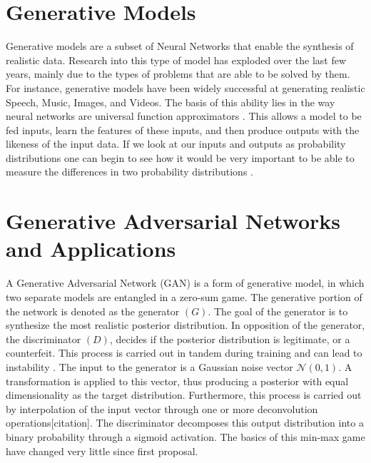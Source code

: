 \section{Generative Models}
Generative models are a subset of Neural Networks that enable the synthesis of realistic data. Research into this type of model has exploded over the last few years, mainly due to the types of problems that are able to be solved by them. For instance, generative models have been widely successful at generating realistic Speech, Music, Images, and Videos. The basis of this ability lies in the way neural networks are universal function approximators \cite{universal}. This allows a model to be fed inputs, learn the features of these inputs, and then produce outputs with the likeness of the input data. If we look at our inputs and outputs as probability distributions one can begin to see how it would be very important to be able to measure the differences in two probability distributions \cite{Goodfellow-et-al-2016}.


\section{Generative Adversarial Networks and Applications}
A Generative Adversarial Network (GAN) is a form of generative model, in which two separate models are entangled in a zero-sum game. The generative portion of the network is denoted as the generator $(G)$. The goal of the generator is to synthesize the most realistic posterior distribution. In opposition of the generator, the discriminator $(D)$, decides if the posterior distribution is legitimate, or a counterfeit. This process is carried out in tandem during training and can lead to instability \cite{GAN}. The input to the generator is a Gaussian noise vector $\mathcal{N}(0, 1)$. A transformation is applied to this vector, thus producing a posterior with equal dimensionality as the target distribution. Furthermore, this process is carried out by interpolation of the input vector through one or more deconvolution operations[citation]. The discriminator decomposes this output distribution into a binary probability through a sigmoid activation. The basics of this min-max game have changed very little since first proposal. 


